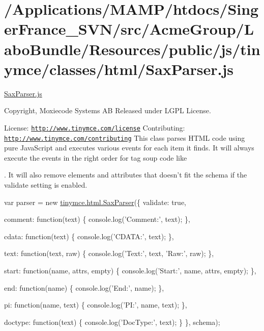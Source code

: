 \hypertarget{_2_applications_2_m_a_m_p_2htdocs_2_singer_france__s_v_n_2src_2_acme_group_2_labo_bundle_2_resou639247e417f9eac4fb5641f456d4ec22}{\section{/\+Applications/\+M\+A\+M\+P/htdocs/\+Singer\+France\+\_\+\+S\+V\+N/src/\+Acme\+Group/\+Labo\+Bundle/\+Resources/public/js/tinymce/classes/html/\+Sax\+Parser.\+js}
}
\hyperlink{_sax_parser_8js}{Sax\+Parser.\+js}

Copyright, Moxiecode Systems A\+B Released under L\+G\+P\+L License.

License\+: \href{http://www.tinymce.com/license}{\tt http\+://www.\+tinymce.\+com/license} Contributing\+: \href{http://www.tinymce.com/contributing}{\tt http\+://www.\+tinymce.\+com/contributing} This class parses H\+T\+M\+L code using pure Java\+Script and executes various events for each item it finds. It will always execute the events in the right order for tag soup code like {\bfseries }

{\bfseries }

. It will also remove elements and attributes that doesn't fit the schema if the validate setting is enabled.

var parser = new \hyperlink{classtinymce_1_1html_1_1_sax_parser}{tinymce.\+html.\+Sax\+Parser}(\{ validate\+: true,

comment\+: function(text) \{ console.\+log('Comment\+:', text); \},

cdata\+: function(text) \{ console.\+log('C\+D\+A\+T\+A\+:', text); \},

text\+: function(text, raw) \{ console.\+log('Text\+:', text, 'Raw\+:', raw); \},

start\+: function(name, attrs, empty) \{ console.\+log('Start\+:', name, attrs, empty); \},

end\+: function(name) \{ console.\+log('End\+:', name); \},

pi\+: function(name, text) \{ console.\+log('P\+I\+:', name, text); \},

doctype\+: function(text) \{ console.\+log('Doc\+Type\+:', text); \} \}, schema);


\begin{DoxyCodeInclude}
\end{DoxyCodeInclude}
 
